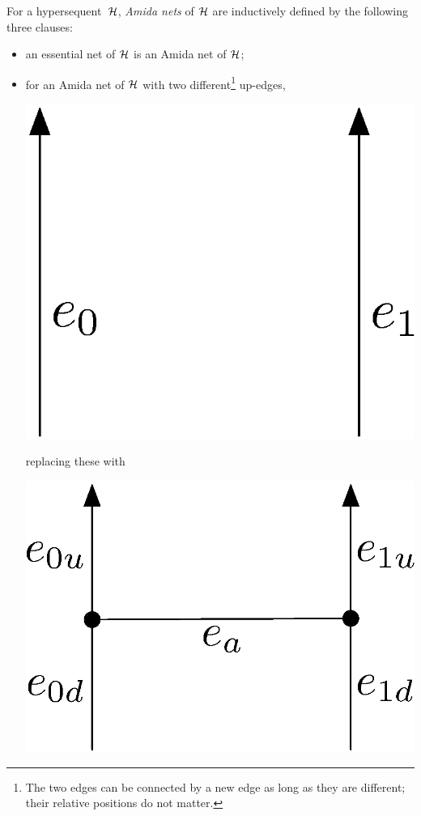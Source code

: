  \begin{definition}
  \label{def:amidanets}
For a hypersequent~$\mathcal{H}$,
\textit{Amida nets} of $\mathcal{H}$ are inductively
  defined by the following three clauses:
\begin{itemize}
 \item an essential net of $\mathcal{H}$ is an Amida net of $\mathcal{H}$;
 \item for an Amida net of $\mathcal{H}$ with two different\footnote{The two edges can
       be connected by a new edge as long as they are different; their
       relative positions do not matter.} up-edges,
	\begin{center}
	 \includegraphics[scale=0.4]{twoedges.eps}
	\end{center}
       replacing these with
	\begin{center}
	 \includegraphics[scale=0.4]{twoedges_amida.eps}

\end{center}
\end{itemize}
\end{definition}
